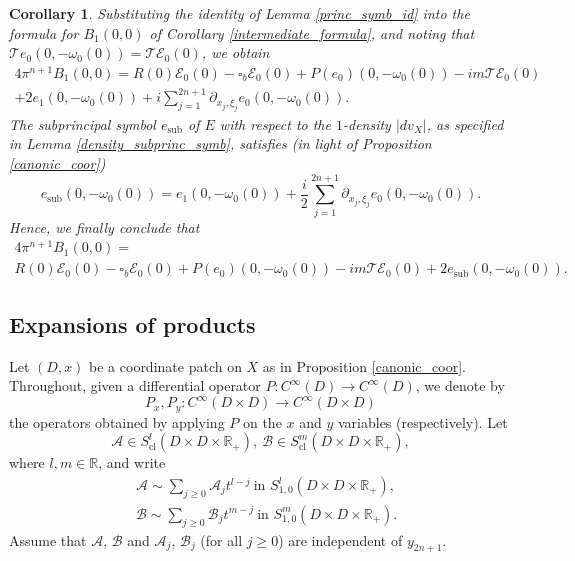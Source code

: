 \documentclass{article}
\newtheorem{corollary}[theorem]{Corollary}
\newcommand{\RR}{\mathbb R}
\newcommand{\mca}{\mathcal A}
\newcommand{\mcb}{\mathcal B}
\newcommand{\mce}{\mathcal E}
\newcommand{\mct}{\mathcal T}
\DeclareMathOperator{\sub}{sub}
\DeclareMathOperator{\cl}{cl}
\begin{document}
\begin{corollary} Substituting the identity of Lemma \ref{princ_symb_id} into the formula for $B_{1}(0,0)$ of Corollary \ref{intermediate_formula}, and noting that $\mct e_0(0, -\omega_0(0)) = \mct \mce_0(0)$, we obtain
%
\begin{multline*} 4 \pi^{n+1}B_{1}(0,0) = R(0) \mathcal E_0(0) -\square_b \mathcal E_0(0)  + P(e_0)(0, -\omega_0(0))-i m \mct \mce_0(0)\\+ 2 e_1(0, -\omega_0(0)) + i \sum_{j=1}^{2n+1} \partial_{x_j, \xi_j} e_0(0, -\omega_0(0)). \end{multline*}
The subprincipal symbol $e_{\sub}$ of $E$ with respect to the $1$-density $|dv_X|$, as specified in Lemma \ref{density_subprinc_symb}, satisfies (in light of Proposition \ref{canonic_coor}) $$e_{\sub}(0, -\omega_0(0)) = e_1(0,-\omega_0(0)) + \frac i 2 \sum_{j=1}^{2n+1} \partial_{x_j, \xi_j} e_0(0, -\omega_0(0)).$$
Hence, we finally conclude that \begin{multline*}4\pi^{n+1} B_1(0,0) = \\ R(0) \mathcal E_0(0) - \square_b \mathcal E_0(0) + P(e_0)(0, -\omega_0(0)) - i m \mct \mce_0(0)+2 e_{\sub}(0, -\omega_0(0)).\end{multline*} \end{corollary}
\subsection{Expansions of products}
%
Let $(D, x)$ be a coordinate patch on $X$ as in Proposition \ref{canonic_coor}. Throughout, given a differential operator $P : C^\infty(D) \to C^\infty(D)$, we denote by $$P_x, P_y : C^\infty(D \times D) \to C^\infty(D \times D)$$ the operators obtained by applying $P$ on the $x$ and $y$ variables (respectively). Let $$\mca \in S^l_{\cl}(D \times D \times \RR_+),\ \mcb \in S^m_{\cl}(D \times D \times \RR_+),$$
%
where $l, m \in \RR$, and write
%
\begin{equation*} \begin{aligned} & \mca \sim \sum_{j \ge 0} \mca_j t^{l-j}\ \text{in } S^l_{1,0}(D \times D \times \RR_+),\\ & \mcb \sim \sum_{j \ge 0} \mcb_j t^{m-j}\ \text{in } S^m_{1,0}(D \times D \times \RR_+).\end{aligned} \end{equation*}
Assume that $\mca$, $\mcb$ and $\mca_j$, $\mcb_j$ (for all $j \ge 0$) are independent of $y_{2n+1}$.
%
\end{document}
